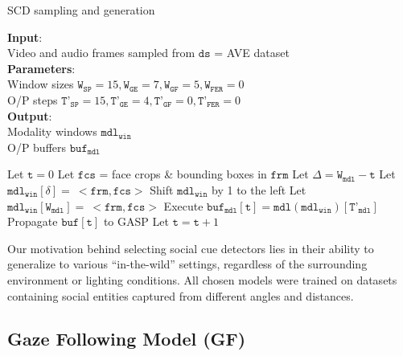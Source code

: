 \documentclass{article}
\begin{document}
\begin{algorithm}[h!]
\caption{SCD sampling and generation}
\label{alg:stage1}
\textbf{Input}: \\
Video and audio frames sampled from $\texttt{ds}$ = AVE dataset \\
\textbf{Parameters}:\\
Window sizes $\texttt{W}_{\texttt{SP}}=15, \texttt{W}_{\texttt{GE}}=7, \texttt{W}_{\texttt{GF}}=5, \texttt{W}_{\texttt{FER}}=0$\\
O/P steps $\texttt{T'}_{\texttt{SP}}=15, \texttt{T'}_{\texttt{GE}}=4, \texttt{T'}_{\texttt{GF}}=0, \texttt{T'}_{\texttt{FER}}=0$\\
\textbf{Output}: \\
Modality windows $\texttt{mdl}_{\texttt{win}}$\\ 
O/P buffers $\texttt{buf}_{\texttt{mdl}}$
\begin{algorithmic}[1] 
\STATE Let $\texttt{t}=0$
\STATE Let $\texttt{fcs}$ = face crops \& bounding boxes in $\texttt{frm}$ 
\STATE Let $\Delta = \texttt{W}_{\texttt{mdl}} - \texttt{t}$
\STATE Let $\texttt{mdl}_{\texttt{win}}[\delta] =\:<\!\texttt{frm}, \texttt{fcs}\!>$
\ENDFOR
\ELSE
\STATE Shift $\texttt{mdl}_{\texttt{win}}$ by 1 to the left
\STATE Let $\texttt{mdl}_{\texttt{win}}[\texttt{W}_{\texttt{mdl}}] =\:<\!\texttt{frm},\texttt{fcs}\!>$
\ENDIF
\STATE Execute $\texttt{buf}_{\texttt{mdl}}[\texttt{t}] = \texttt{mdl}(\texttt{mdl}_{\texttt{win}})[\texttt{T'}_{\texttt{mdl}}]$
\ENDFOR
\STATE Propagate $\texttt{buf}[\texttt{t}]$ to GASP
\STATE Let $\texttt{t}=\texttt{t}+1$
\ENDFOR
\ENDFOR
\end{algorithmic}
\end{algorithm}

Our motivation behind selecting social cue detectors lies in their ability to generalize to various ``in-the-wild'' settings, regardless of the surrounding environment or lighting conditions. All chosen models were trained on datasets containing social entities captured from different angles and distances. 

\subsection{Gaze Following Model (GF)}
\end{document}
